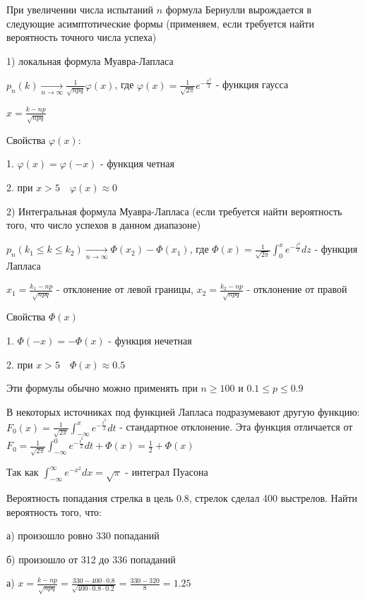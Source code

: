 \documentclass[12pt]{article}
\begin{document}
    При увеличении числа испытаний $n$ формула Бернулли вырождается в следующие асимптотические формы (применяем, если требуется найти вероятность точного числа успеха)

    1) локальная формула Муавра-Лапласа

    $p_n(k) \underset{n \to \infty}{\longrightarrow} \frac{1}{\sqrt{npq}} \varphi(x)$, где $\varphi(x) = \frac{1}{\sqrt{2\pi}} e^{-\frac{x^2}{2}}$ - функция гаусса

    $x = \frac{k - np}{\sqrt{npq}}$

    Свойства $\varphi(x)$:

    1. $\varphi(x) = \varphi(-x)$ - функция четная

    2. при $x > 5 \quad \varphi(x) \approx 0$

    2) Интегральная формула Муавра-Лапласа (если требуется найти вероятность того, что число успехов в данном диапазоне)

    $p_n(k_1 \leq k \leq k_2) \underset{n \to \infty}{\longrightarrow} \Phi(x_2) - \Phi(x_1)$, где $\Phi(x) = \frac{1}{\sqrt{2\pi}} \int_0^x e^{-\frac{z^2}{2}} dz$ - функция Лапласа

    $x_1 = \frac{k_1 - np}{\sqrt{npq}}$ - отклонение от левой границы, $x_2 = \frac{k_2 - np}{\sqrt{npq}}$ - отклонение от правой

    Свойства $\Phi(x)$

    1. $\Phi(-x) = -\Phi(x)$ - функция нечетная

    2. при $x > 5 \quad \Phi(x) \approx 0.5$

    \Nota Эти формулы обычно можно применять при $n \geq 100$ и $0.1 \leq p \leq 0.9$

    \Nota В некоторых источниках под функцией Лапласа подразумевают другую функцию: $F_0(x) = \frac{1}{\sqrt{2\pi}} \int_{-\infty}^x e^{-\frac{t^2}{2}}dt$ - стандартное отклонение. Эта функция
    отличается от $F_0 = \frac{1}{\sqrt{2\pi}} \int_{-\infty}^0 e^{-\frac{t^2}{2}}dt + \Phi(x) = \frac{1}{2} + \Phi(x)$

    Так как $\int_{-\infty}^{\infty} e^{-x^2} dx = \sqrt{\pi}$ - интеграл Пуасона

    \Ex Вероятность попадания стрелка в цель $0.8$, стрелок сделал 400 выстрелов. Найти вероятность того, что:

    а) произошло ровно 330 попаданий

    б) произошло от 312 до 336 попаданий

    а) $x = \frac{k - np}{\sqrt{npq}} = \frac{330 - 400 \cdot 0.8}{\sqrt{400 \cdot 0.8 \cdot 0.2}} = \frac{330 - 320}{8} = 1.25$
\end{document}

